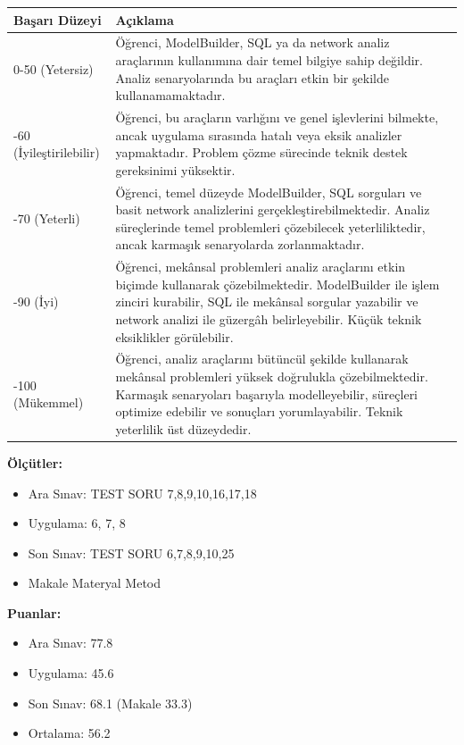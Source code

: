 \documentclass[12pt,a4paper]{article}
\begin{document}
\vspace{0.5cm}
\begin{longtable}{p{3cm}p{12cm}}
\toprule
\textbf{Başarı Düzeyi} & \textbf{Açıklama} \\
\midrule
0-50 (Yetersiz) & Öğrenci, ModelBuilder, SQL ya da network analiz araçlarının kullanımına dair temel bilgiye sahip değildir. Analiz senaryolarında bu araçları etkin bir şekilde kullanamamaktadır. \\
\addlinespace
50-60 (İyileştirilebilir) & Öğrenci, bu araçların varlığını ve genel işlevlerini bilmekte, ancak uygulama sırasında hatalı veya eksik analizler yapmaktadır. Problem çözme sürecinde teknik destek gereksinimi yüksektir. \\
\addlinespace
60-70 (Yeterli) & Öğrenci, temel düzeyde ModelBuilder, SQL sorguları ve basit network analizlerini gerçekleştirebilmektedir. Analiz süreçlerinde temel problemleri çözebilecek yeterliliktedir, ancak karmaşık senaryolarda zorlanmaktadır. \\
\addlinespace
70-90 (İyi) & Öğrenci, mekânsal problemleri analiz araçlarını etkin biçimde kullanarak çözebilmektedir. ModelBuilder ile işlem zinciri kurabilir, SQL ile mekânsal sorgular yazabilir ve network analizi ile güzergâh belirleyebilir. Küçük teknik eksiklikler görülebilir. \\
\addlinespace
90-100 (Mükemmel) & Öğrenci, analiz araçlarını bütüncül şekilde kullanarak mekânsal problemleri yüksek doğrulukla çözebilmektedir. Karmaşık senaryoları başarıyla modelleyebilir, süreçleri optimize edebilir ve sonuçları yorumlayabilir. Teknik yeterlilik üst düzeydedir. \\
\bottomrule
\end{longtable}

\vspace{0.5cm}
\textbf{Ölçütler:} 
\begin{itemize}
    \item Ara Sınav: TEST SORU 7,8,9,10,16,17,18
    \item Uygulama: 6, 7, 8
    \item Son Sınav: TEST SORU 6,7,8,9,10,25
    \item Makale Materyal Metod
\end{itemize}

\textbf{Puanlar:} 
\begin{itemize}
    \item Ara Sınav: 77.8
    \item Uygulama: 45.6
    \item Son Sınav: 68.1 (Makale 33.3)
    \item Ortalama: 56.2
\end{itemize}
\end{document}
